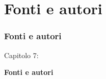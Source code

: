 %

\section{Fonti e autori}
\begin{frame}[fragile]
	\frametitle{Fonti e autori}

	\begin{center}\huge{Capitolo 7:}\end{center}
	\begin{center}\huge{\color{typo3darkgrey}\textbf{Fonti e autori}}\end{center}

\end{frame}


